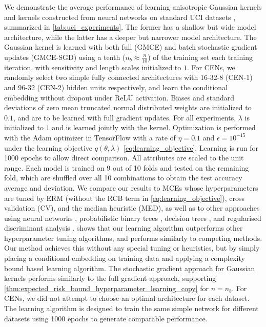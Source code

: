 \documentclass{llncs}
\begin{document}
	We demonstrate the average performance of learning anisotropic Gaussian kernels and kernels constructed from neural networks on standard UCI datasets \citep{bache2013uci}, summarized in \cref{tab:uci_experiments}. The former has a shallow but wide model architecture, while the latter has a deeper but narrower model architecture. The Gaussian kernel is learned with both full (G\gls{MCE}) and batch stochastic gradient updates (G\gls{MCE}-SGD) using a tenth ($n_{b} \approx \frac{n}{10}$) of the training set each training iteration, with sensitivity and length scales initialized to $1$. For \glspl{CEN}, we randomly select two simple fully connected architectures with 16-32-8 (\gls{CEN}-1) and 96-32 (\gls{CEN}-2) hidden units respectively, and learn the conditional embedding without dropout under ReLU activation. Biases and standard deviations of zero mean truncated normal distributed weights are initialized to $0.1$, and are to be learned with full gradient updates. For all experiments, $\lambda$ is initialized to $1$ and is learned jointly with the kernel. Optimization is performed with the Adam optimizer \citep{kingma2014adam} in TensorFlow \citep{abadi2016tensorflow} with a rate of $\eta = 0.1$ and $\epsilon = 10^{-15}$ under the learning objective $q(\theta, \lambda)$ \eqref{eq:learning_objective}. Learning is run for 1000 epochs to allow direct comparison. All attributes are scaled to the unit range. Each model is trained on 9 out of 10 folds and tested on the remaining fold, which are shuffled over all 10 combinations to obtain the test accuracy average and deviation. We compare our results to \glspl{MCE} whose hyperparameters are tuned by \gls{ERM} (without the \gls{RCB} term in \eqref{eq:learning_objective}), cross validation (CV), and the median heuristic (MED), as well as to other approaches using neural networks \citep[a; c]{kaya2016banknote, freire2009short}, probabilistic binary trees \citep[b]{horton1996probabilistic}, decision trees \citep[d]{zhou2004size}, and regularised discriminant analysis \citep[e]{aeberhard1992comparison}.  shows that our learning algorithm outperforms other hyperparameter tuning algorithms, and performs similarly to competing methods. Our method achieves this without any special tuning or heuristics, but by simply placing a conditional embedding on training data and applying a complexity bound based learning algorithm. The stochastic gradient approach for Gaussian kernels performs similarly to the full gradient approach, supporting \cref{thm:expected_risk_bound_hyperparameter_learning_copy} for $n = n_{b}$. For \glspl{CEN}, we did not attempt to choose an optimal architecture for each dataset. The learning algorithm is designed to train the same simple network for different datasets using 1000 epochs to generate comparable performance. 
	
\end{document}

